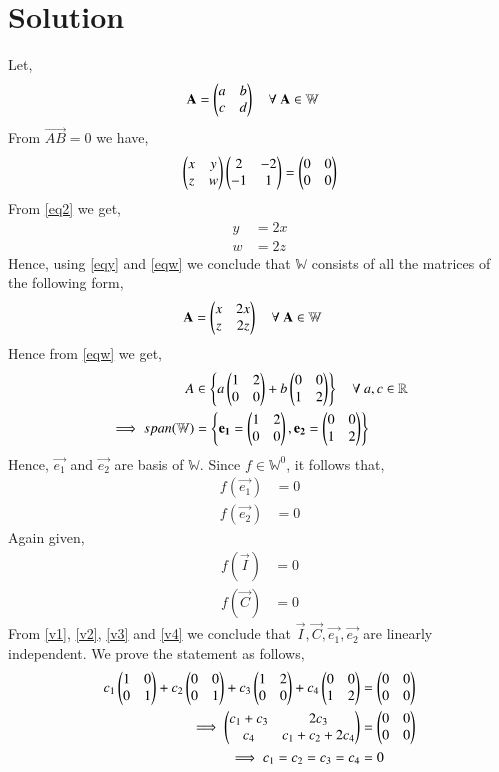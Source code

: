 \documentclass[journal,12pt,twocolumn]{IEEEtran}
\begin{document}
\section{\textbf{Solution}}
Let,
\begin{align}
\mathbf{A} &= \begin{pmatrix}a&b\\c&d\end{pmatrix} \quad{\text{$\forall$ $\mathbf{A} \in \mathbb{W}$}}
\end{align}
From $\vec{AB} = 0$ we have,
\begin{align}
\begin{pmatrix}x&y\\z&w\end{pmatrix}\begin{pmatrix}2&-2\\-1&1\end{pmatrix} = \begin{pmatrix}0&0\\0&0\end{pmatrix}\label{eq2}
\end{align}
From \eqref{eq2} we get,
\begin{align}
y &= 2x\label{eqy}\\
w &= 2z\label{eqw}
\end{align}
Hence, using \eqref{eqy} and \eqref{eqw} we conclude that $\mathbb{W}$ consists of all the matrices of the following form,
\begin{align}
\mathbf{A} &= \begin{pmatrix}x&2x\\z&2z\end{pmatrix} \quad{\text{$\forall$ $\mathbf{A} \in \mathbb{W}$}}\label{eqw}
\end{align}
Hence from \eqref{eqw} we get,
\begin{align}
A &\in \left\{a\begin{pmatrix}1&2\\0&0\end{pmatrix}+b\begin{pmatrix}0&0\\1&2\end{pmatrix}\right\} \quad{\text{$\forall$ $a,c \in \mathbb{R}$}}\\
\implies span(\mathbb{W}) &= \left\{\mathbf{e_1} = \begin{pmatrix}1&2\\0&0\end{pmatrix}, \mathbf{e_2} = \begin{pmatrix}0&0\\1&2\end{pmatrix}\right\}
\end{align}
Hence, $\vec{e_1}$ and $\vec{e_2}$ are basis of $\mathbb{W}$.
Since $f \in \mathbb{W}^0$, it follows that,
\begin{align}
f(\vec{e_1}) &= 0\label{v1}\\
f(\vec{e_2}) &= 0\label{v2}
\end{align}
Again given,
\begin{align}
f(\vec{I}) &= 0\label{v3}\\
f(\vec{C}) &= 0\label{v4}
\end{align}
From \eqref{v1}, \eqref{v2}, \eqref{v3} and \eqref{v4} we conclude that $\vec{I},\vec{C},\vec{e_1}, \vec{e_2}$ are linearly independent. We prove the statement as follows,
\begin{align}
c_1\begin{pmatrix}1&0\\0&1\end{pmatrix}+c_2\begin{pmatrix}0&0\\0&1\end{pmatrix}+c_3\begin{pmatrix}1&2\\0&0\end{pmatrix}+c_4\begin{pmatrix}0&0\\1&2\end{pmatrix} &= \begin{pmatrix}0&0\\0&0\end{pmatrix}\\
\implies \begin{pmatrix}c_1+c_3&2c_3\\c_4&c_1+c_2+2c_4\end{pmatrix} &= \begin{pmatrix}0&0\\0&0\end{pmatrix}\\
\implies c_1 = c_2 = c_3 = c_4 &= 0\label{ind}
\end{align}
\end{document}
